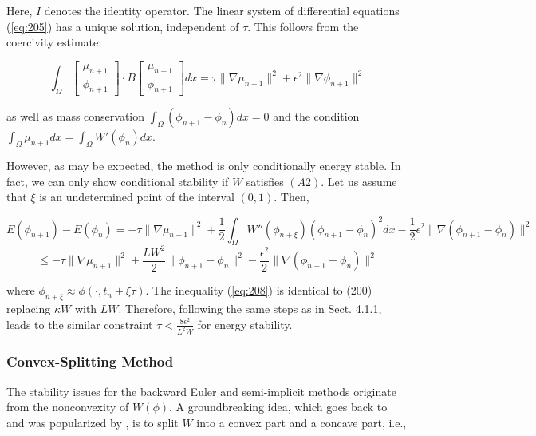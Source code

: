 \documentclass{article}
\begin{document}
Here, $I$ denotes the identity operator. The linear system of differential equations (\ref{eq:205}) has a unique solution, independent of $\tau$. This follows from the coercivity estimate:

\begin{equation}
\int_{\Omega}
\begin{bmatrix}
\mu_{n+1} \\
\phi_{n+1}
\end{bmatrix}
\cdot B
\begin{bmatrix}
\mu_{n+1} \\
\phi_{n+1}
\end{bmatrix}
dx = \tau \|\nabla\mu_{n+1}\|^2 + \epsilon^2\|\nabla\phi_{n+1}\|^2 \label{eq:207}
\end{equation}

as well as mass conservation $\int_{\Omega}(\phi_{n+1} - \phi_n)dx = 0$ and the condition $\int_{\Omega} \mu_{n+1} dx = \int_{\Omega} W'(\phi_n) dx$.

However, as may be expected, the method is only conditionally energy stable. In fact, we can only show conditional stability if $W$ satisfies $(A2)$. Let us assume that $\xi$ is an undetermined point of the interval $(0, 1)$. Then,

\begin{equation}
E(\phi_{n+1}) - E(\phi_n) = -\tau \|\nabla\mu_{n+1}\|^2 + \frac{1}{2} \int_{\Omega} W''(\phi_{n+\xi})(\phi_{n+1} - \phi_n)^2dx - \frac{1}{2}\epsilon^2\|\nabla(\phi_{n+1} - \phi_n)\|^2 \label{eq:208}
\end{equation}
\begin{equation}
\leq -\tau \|\nabla\mu_{n+1}\|^2 + \frac{LW^2}{2} \|\phi_{n+1} - \phi_n\|^2 - \frac{\epsilon^2}{2} \|\nabla(\phi_{n+1} - \phi_n)\|^2 \label{eq:208}
\end{equation}

where $\phi_{n+\xi} \approx \phi(\cdot, t_n + \xi\tau)$. The inequality (\ref{eq:208}) is identical to (200) replacing $\kappa W$ with $LW$. Therefore, following the same steps as in Sect. 4.1.1, leads to the similar constraint $\tau < \frac{8\epsilon^2}{L^2W}$ for energy stability.
\subsubsection{Convex-Splitting Method}

The stability issues for the backward Euler and semi-implicit methods originate from the nonconvexity of $W(\phi)$. A groundbreaking idea, which goes back to \cite{Elliott1993TheGD} and was popularized by \cite{Eyre1998UnconditionallyGS}, is to split $W$ into a convex part and a concave part, i.e.,
\end{document}
